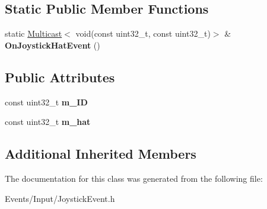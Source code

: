\subsection*{Static Public Member Functions}
\begin{DoxyCompactItemize}
\item 
\mbox{\label{classJoystickHatEvent_a3dec0eb4da50888cd0298f9dbea4b901}} 
static \hyperlink{classMulticast}{Multicast}$<$ void(const uint32\+\_\+t, const uint32\+\_\+t)$>$ \& {\bfseries On\+Joystick\+Hat\+Event} ()
\end{DoxyCompactItemize}
\subsection*{Public Attributes}
\begin{DoxyCompactItemize}
\item 
\mbox{\label{classJoystickHatEvent_a75f4b7bc2780f3383734835ace5d11a8}} 
const uint32\+\_\+t {\bfseries m\+\_\+\+ID}
\item 
\mbox{\label{classJoystickHatEvent_ae161b103e15c5494b267401ddc4513ed}} 
const uint32\+\_\+t {\bfseries m\+\_\+hat}
\end{DoxyCompactItemize}
\subsection*{Additional Inherited Members}


The documentation for this class was generated from the following file\+:\begin{DoxyCompactItemize}
\item 
Events/\+Input/Joystick\+Event.\+h\end{DoxyCompactItemize}
